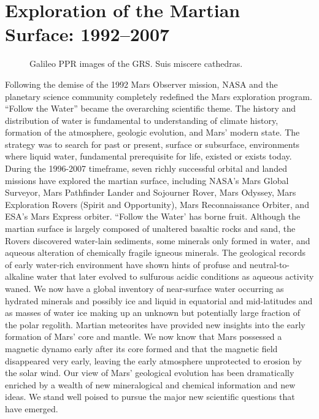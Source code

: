 \author[Soderblom \&\ Bell]{l. a. soderblom and j. f. bell iii}
\chapter{Exploration of the Martian Surface: 1992--2007}

\begin{figure*}%
\caption{Galileo PPR images of the GRS. Suis miscere
  cathedras.}
\end{figure*}


Following the demise of the 1992 Mars Observer mission,
NASA and the planetary science community completely redefined
the Mars exploration program. ``Follow the Water''
became the overarching scientific theme. The history and distribution
of water is fundamental to understanding of climate
history, formation of the atmosphere, geologic evolution, and
Mars' modern state. The strategy was to search for past or
present, surface or subsurface, environments where liquid
water, fundamental prerequisite for life, existed or exists today.
During the 1996-2007 timeframe, seven richly successful
orbital and landed missions have explored the martian surface,
including NASA's Mars Global Surveyor, Mars Pathfinder
Lander and Sojourner Rover, Mars Odyssey, Mars Exploration
Rovers (Spirit and Opportunity), Mars Reconnaissance Orbiter,
and ESA's Mars Express orbiter. ``Follow the Water' has borne
fruit. Although the martian surface is largely composed of unaltered
basaltic rocks and sand, the Rovers discovered water-lain
sediments, some minerals only formed in water, and aqueous
alteration of chemically fragile igneous minerals. The geological
records of early water-rich environment have shown hints
of profuse and neutral-to-alkaline water that later evolved to
sulfurous acidic conditions as aqueous activity waned. We now
have a global inventory of near-surface water occurring as
hydrated minerals and possibly ice and liquid in equatorial and
mid-latitudes and as masses of water ice making up an
unknown but potentially large fraction of the polar regolith.
Martian meteorites have provided new insights into the early
formation of Mars' core and mantle. We now know that Mars
possessed a magnetic dynamo early after its core formed and
that the magnetic field disappeared very early, leaving the early
atmosphere unprotected to erosion by the solar wind. Our view
of Mars' geological evolution has been dramatically enriched
by a wealth of new mineralogical and chemical information and
new ideas. We stand well poised to pursue the major new scientific
questions that have emerged.

